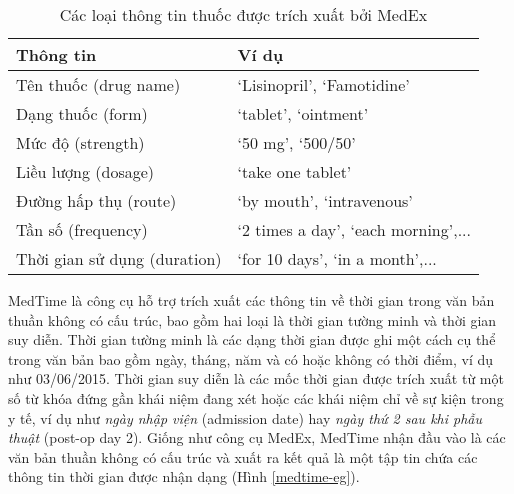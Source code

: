 \begin{table}[ht]
\centering{}
\caption{Các loại thông tin thuốc được trích xuất bởi MedEx\label{tab:med-info}}
\footnotesize\sffamily

\begin{tabularx}{0.8\textwidth}{@{}XX@{}}
\toprule
\textbf{Thông tin} & \textbf{Ví dụ}\\
\midrule
Tên thuốc (drug name) & `Lisinopril', `Famotidine'\\
Dạng thuốc (form) & `tablet', `ointment'\\
Mức độ (strength) & `50 mg', `500/50'\\
Liều lượng (dosage) & `take one tablet'\\
Đường hấp thụ (route) & `by mouth', `intravenous'\\
Tần số (frequency) & `2 times a day', `each morning',...\\
Thời gian sử dụng (duration) & `for 10 days', `in a month',...\\
\bottomrule
\end{tabularx}
\end{table}

MedTime là công cụ hỗ trợ trích xuất các thông tin về thời gian trong văn bản thuần không có cấu trúc, bao gồm hai loại là thời gian tường minh và thời gian suy diễn. Thời gian tường minh là các dạng thời gian được ghi một cách cụ thể trong văn bản bao gồm ngày, tháng, năm và có hoặc không có thời điểm, ví dụ như 03/06/2015. Thời gian suy diễn là các mốc thời gian được trích xuất từ một số từ khóa đứng gần khái niệm đang xét hoặc các khái niệm chỉ về sự kiện trong y tế, ví dụ như \emph{ngày nhập viện} (admission date) hay \emph{ngày thứ 2 sau khi phẫu thuật} (post-op day 2). Giống như công cụ MedEx, MedTime nhận đầu vào là các văn bản thuần không có cấu trúc và xuất ra kết quả là một tập tin chứa các thông tin thời gian được nhận dạng (Hình \ref{medtime-eg}).

